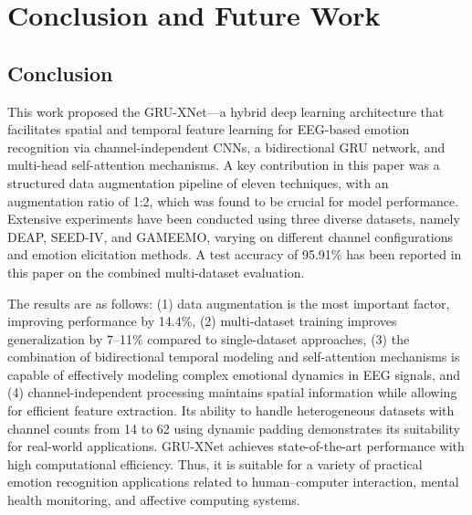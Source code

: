 \documentclass[conference]{IEEEtran}
\begin{document}



\section{Conclusion and Future Work}
\label{sec:conclusion}


\subsection{Conclusion}

This work proposed the GRU-XNet---a hybrid deep learning architecture that facilitates spatial and temporal feature learning for EEG-based emotion recognition via channel-independent CNNs, a bidirectional GRU network, and multi-head self-attention mechanisms. A key contribution in this paper was a structured data augmentation pipeline of eleven techniques, with an augmentation ratio of 1:2, which was found to be crucial for model performance. Extensive experiments have been conducted using three diverse datasets, namely DEAP, SEED-IV, and GAMEEMO, varying on different channel configurations and emotion elicitation methods. A test accuracy of 95.91\% has been reported in this paper on the combined multi-dataset evaluation.

The results are as follows: (1) data augmentation is the most important factor, improving performance by 14.4\%, (2) multi-dataset training improves generalization by 7–11\% compared to single-dataset approaches, (3) the combination of bidirectional temporal modeling and self-attention mechanisms is capable of effectively modeling complex emotional dynamics in EEG signals, and (4) channel-independent processing maintains spatial information while allowing for efficient feature extraction. Its ability to handle heterogeneous datasets with channel counts from 14 to 62 using dynamic padding demonstrates its suitability for real-world applications. GRU-XNet achieves state-of-the-art performance with high computational efficiency. Thus, it is suitable for a variety of practical emotion recognition applications related to human–computer interaction, mental health monitoring, and affective computing systems.
\end{document}
